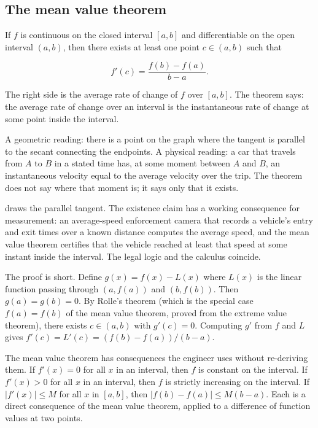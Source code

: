 \subsection{The mean value theorem}

\begin{theorem}
If $f$ is continuous on the closed interval $[a, b]$ and
differentiable on the open interval $(a, b)$, then there exists at
least one point $c \in (a, b)$ such that

\[
f'(c) = \frac{f(b) - f(a)}{b - a}.
\]
\end{theorem}

The right side is the average rate of change of $f$ over $[a, b]$.
The theorem says: the average rate of change over an interval is
the instantaneous rate of change at some point inside the interval.

A geometric reading: there is a point on the graph where the
tangent is parallel to the secant connecting the endpoints. A
physical reading: a car that travels from $A$ to $B$ in a stated
time has, at some moment between $A$ and $B$, an instantaneous
velocity equal to the average velocity over the trip. The theorem
does not say where that moment is; it says only that it exists.



 draws the parallel tangent. The
existence claim has a working consequence for measurement: an
average-speed enforcement camera that records a vehicle's entry and
exit times over a known distance computes the average speed, and
the mean value theorem certifies that the vehicle reached at least
that speed at some instant inside the interval. The legal logic and
the calculus coincide.

The proof is short. Define $g(x) = f(x) - L(x)$ where $L(x)$ is
the linear function passing through $(a, f(a))$ and $(b, f(b))$.
Then $g(a) = g(b) = 0$. By Rolle's theorem (which is the special
case $f(a) = f(b)$ of the mean value theorem, proved from the
extreme value theorem), there exists $c \in (a, b)$ with $g'(c) =
0$. Computing $g'$ from $f$ and $L$ gives $f'(c) = L'(c) = (f(b)
- f(a))/(b - a)$.

The mean value theorem has consequences the engineer uses without
re-deriving them. If $f'(x) = 0$ for all $x$ in an interval, then
$f$ is constant on the interval. If $f'(x) > 0$ for all $x$ in an
interval, then $f$ is strictly increasing on the interval. If
$|f'(x)| \leq M$ for all $x$ in $[a, b]$, then $|f(b) - f(a)| \leq
M (b - a)$. Each is a direct consequence of the mean value
theorem, applied to a difference of function values at two
points.

